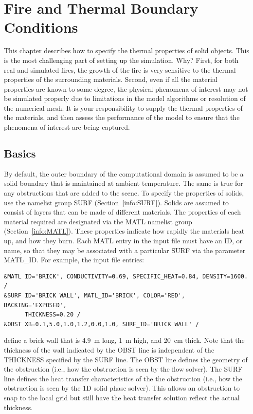 \documentclass[11pt]{book}
\begin{document}
\chapter{Fire and Thermal Boundary Conditions}

This chapter describes how to specify the thermal properties of solid objects. This is
the most challenging part of setting up the simulation. Why?  First,
for both real and simulated fires, the growth of the fire is very
sensitive to the thermal properties of the surrounding
materials. Second, even if all the material properties are known to
some degree, the physical phenomena of interest may not be simulated
properly due to limitations in the model algorithms or resolution of
the numerical mesh. It is your responsibility to supply the thermal
properties of the materials, and then assess the performance of the
model to ensure that the phenomena of interest are being captured.


\section{Basics}
\label{info:SURF_MATL_Basics}

By default, the outer boundary of the computational domain is assumed
to be a solid boundary that is maintained at ambient temperature. The
same is true for any obstructions that are added to the scene. To
specify the properties of solids, use the namelist group {\ct SURF}
(Section~\ref{info:SURF}). Solids are assumed to
consist of layers that can be made of different materials.  The
properties of each material required are designated via the {\ct MATL}
namelist group (Section~\ref{info:MATL}).  These properties indicate how
rapidly the materials heat up, and how they burn.  Each {\ct MATL}
entry in the input file must have an {\ct ID}, or name, so that they
may be associated with a particular {\ct SURF} via the parameter {\ct
MATL\_ID}.  For example, the input file entries:

\begin{lstlisting}
&MATL ID='BRICK', CONDUCTIVITY=0.69, SPECIFIC_HEAT=0.84, DENSITY=1600. /
&SURF ID='BRICK WALL', MATL_ID='BRICK', COLOR='RED', BACKING='EXPOSED',
      THICKNESS=0.20 /
&OBST XB=0.1,5.0,1.0,1.2,0.0,1.0, SURF_ID='BRICK WALL' /
\end{lstlisting}

\noindent
define a brick wall that is 4.9~m long, 1~m high, and 20~cm thick. Note that the thickness of the wall indicated by the {\ct OBST} line is independent of the {\ct THICKNESS} specified by the {\ct SURF} line.  The {\ct OBST} line defines the geometry of the obstruction (i.e., how the obstruction is seen by the flow solver).  The {\ct SURF} line defines the heat transfer characteristics of the the obstruction (i.e., how the obstruction is seen by the 1D solid phase solver).  This allows an obstruction to snap to the local grid but still have the heat transfer solution reflect the actual thickness.
\end{document}
